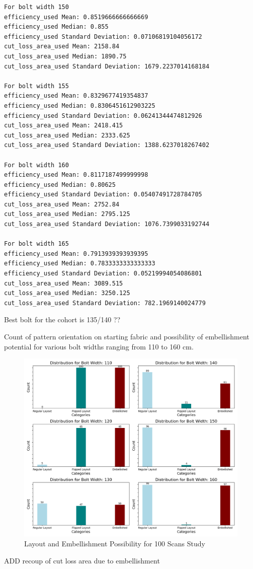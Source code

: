 \begin{verbatim}
For bolt width 150
efficiency_used Mean: 0.8519666666666669
efficiency_used Median: 0.855
efficiency_used Standard Deviation: 0.07106819104056172
cut_loss_area_used Mean: 2158.84
cut_loss_area_used Median: 1890.75
cut_loss_area_used Standard Deviation: 1679.2237014168184

For bolt width 155
efficiency_used Mean: 0.8329677419354837
efficiency_used Median: 0.8306451612903225
efficiency_used Standard Deviation: 0.06241344474812926
cut_loss_area_used Mean: 2418.415
cut_loss_area_used Median: 2333.625
cut_loss_area_used Standard Deviation: 1388.6237018267402

For bolt width 160
efficiency_used Mean: 0.8117187499999998
efficiency_used Median: 0.80625
efficiency_used Standard Deviation: 0.05407491728784705
cut_loss_area_used Mean: 2752.84
cut_loss_area_used Median: 2795.125
cut_loss_area_used Standard Deviation: 1076.7399033192744

For bolt width 165
efficiency_used Mean: 0.7913939393939395
efficiency_used Median: 0.7833333333333333
efficiency_used Standard Deviation: 0.05219994054086801
cut_loss_area_used Mean: 3089.515
cut_loss_area_used Median: 3250.125
cut_loss_area_used Standard Deviation: 782.1969140024779
\end{verbatim}

Best bolt for the cohort is 135/140 ??

Count of pattern orientation on starting fabric and possibility of embellishment potential for various bolt widths ranging from 110 to 160 cm.
\begin{figure} [H] %
    \centering %
    \includegraphics[width = \textwidth]{Images/Mendeley_Bar.png} %
    \caption{Layout and Embellishment Possibility for 100 Scans Study}
\end{figure}

ADD recoup of cut loss area due to embellishment